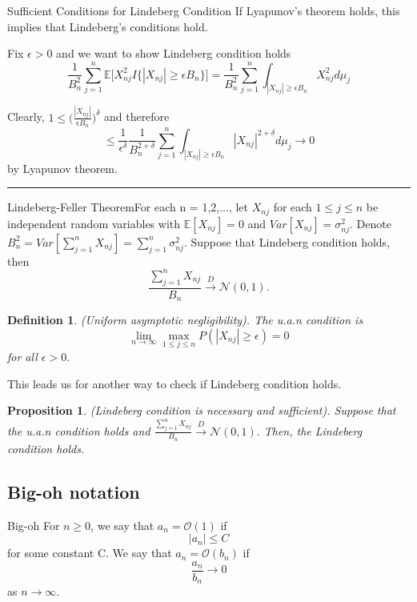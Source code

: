 \documentclass[twoside]{article}
\newtheorem{proposition}[theorem]{Proposition}
\newtheorem{definition}[theorem]{Definition}
\newenvironment{proof}{{\bf Proof:}}{\hfill\rule{2mm}{2mm}}
\begin{document}
\begin{theorem_exam}{Sufficient Conditions for Lindeberg Condition}{} If Lyapunov's theorem holds, this implies that Lindeberg's conditions hold.
\end{theorem_exam}
\begin{proof}
Fix $\epsilon > 0$ and we want to show Lindeberg condition holds
$$
\frac{1}{B_{n}^{2}}\sum_{j=1}^{n}\mathbb{E}\big[X_{nj}^{2}I\{|X_{nj}| \geq \epsilon B_n\} \big] = \frac{1}{B_{n}^{2}}\sum_{j=1}^{n}\int_{|X_{nj}| \geq \epsilon B_n}X_{nj}^{2}d\mu_j
$$

Clearly, $1 \leq \big(\frac{|X_{nj}|}{\epsilon B_n} \big)^{\delta}$
and therefore 
$$
\leq \frac{1}{\epsilon^{\delta}}\frac{1}{B_{n}^{2 + \delta}}\sum_{j=1}^{n}\int_{|X_{nj}| \geq \epsilon B_n}|X_{nj}|^{2 + \delta}d\mu_j \rightarrow 0
$$
by Lyapunov theorem.
\end{proof}


\begin{theorem_exam}{Lindeberg-Feller Theorem}{}For each n = 1,2,..., let $X_{nj}$ for each $1 \leq j \leq n$ be independent random variables with $\mathbb{E}[X_{nj}] = 0$ and $Var[X_{nj}] = \sigma_{nj}^{2}.$ Denote $B_{n}^{2} = Var[\sum_{j=1}^{n}X_{nj}] = \sum_{j=1}^{n}\sigma_{nj}^{2}.$ Suppose that Lindeberg condition holds, then 
$$
\frac{\sum_{j=1}^{n}X_{nj}}{B_{n}} \xrightarrow{D} \mathcal{N}(0,1).
$$
\end{theorem_exam}

\begin{definition}(Uniform asymptotic negligibility). The u.a.n condition is 
$$
\lim_{n \rightarrow \infty}\max_{1 \leq j \leq n}P(|X_{nj}| \geq \epsilon) = 0
$$
for all $\epsilon > 0.$
\end{definition}

This leads us for another way to check if Lindeberg condition holds.

\begin{proposition}(Lindeberg condition is necessary and sufficient). Suppose that the u.a.n condition holds and $\frac{\sum_{j=1}^{n}X_{nj}}{B_{n}} \xrightarrow{D} \mathcal{N}(0,1).$ Then, the Lindeberg condition holds.
\end{proposition}


\subsection{Big-oh notation}


\begin{definition_exam}{Big-oh}{} For $n \geq 0$, we say that $a_n = \mathcal{O}(1)$ if 
\[
|a_n| \leq C
\]
for some constant C. We say that $a_n = \mathcal{O}(b_n)$ if 
\[
  \frac{a_n}{b_n} \rightarrow 0
\]
as $n \rightarrow \infty.$
\end{definition_exam}
\end{document}
